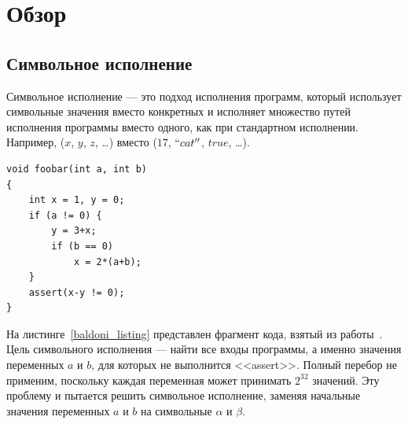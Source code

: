 \section{Обзор}
\subsection{Символьное исполнение}
Символьное исполнение --- это подход исполнения программ, который использует символьные значения вместо конкретных и исполняет множество путей исполнения программы вместо одного, как при стандартном исполнении. Например, ($x$, $y$, $z$, \dots) вместо ($17$, $``cat''$, $true$, \dots). 

\begin{lstlisting}[caption={Программа для иллюстрации символьного исполнения},captionpos=b,label={baldoni_listing}]
void foobar(int a, int b)
{
    int x = 1, y = 0;
    if (a != 0) {
        y = 3+x;
        if (b == 0)
            x = 2*(a+b);
    }
    assert(x-y != 0);
}
\end{lstlisting}
На листинге~\ref{baldoni_listing} представлен фрагмент кода, взятый из работы~\cite{baldoni2018survey}.
Цель символьного исполнения --- найти все входы программы, а именно значения переменных $a$ и $b$, для которых не выполнится <<assert>>. Полный перебор не применим, поскольку каждая переменная может принимать $2^{32}$ значений.
Эту проблему и пытается решить символьное исполнение, заменяя начальные значения переменных $a$ и $b$ на символьные $\alpha$ и $\beta$.


